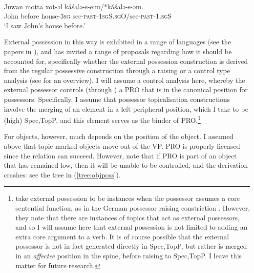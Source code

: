 \documentclass[output=paper
,modfonts
,nonflat]{langsci/langscibook}
\begin{document}
\begin{exe}
	\ex \citet[][346]{nikolaeva1999} \label{ex:n1999possess2}\\
	\gll Juwan motta xot-əl k\v{a}\'{s}alə-s-e:m/*k\v{a}\'{s}alə-s-əm.\\
		 John before house-\textsc{3sg} see-\textsc{past-1sgS.sgO}/see-\textsc{past-1.sgS}\\
	\glt `I saw John's house before.'\label{ex:n1999272}
\end{exe}
\noindent External possession in this way is exhibited in a range of languages (see the papers in \citealp{paynebarshi1999}), and has invited a range of proposals regarding how it should be accounted for, specifically whether the external possession construction is derived from the regular possessive construction through a raising or a control type analysis (see \citealt{deal2013b} for an overview).
I will assume a control analysis here, whereby the external possessor controls (through \agree) a PRO that is in the canonical position for possessors.
Specifically, I assume that possessor topicalisation constructions involve the merging of an element in a left-peripheral position, which I take to be (high) Spec,TopP, and this element serves as the binder of PRO.\footnote{\citet{paynebarshi1999b} take external possession to be instances when the possessor assumes a core sentential function, as in the German possessor raising constriction \citep{hole2005}. However, they note that there are instances of topics that act as external possessors, and so I will assume here that external possession is not limited to adding an extra core argument to a verb.
It is of course possible that the external possessor is not in fact generated directly in Spec,TopP, but rather is merged in an \textit{affectee} position in the spine, before raising to Spec,TopP.
I leave this matter for future research.}


For objects, however, much depends on the position of the object. I assumed above that topic marked objects move out of the VP. PRO is properly licensed since the \agree{} relation can succeed.
However, note that if PRO is part of an object that has remained low, then it will be unable to be controlled, and the derivation crashes: see the tree in (\ref{tree:objposs}).

\begin{exe}
\ex \label{tree:objposs}
\end{exe}
\end{document}
